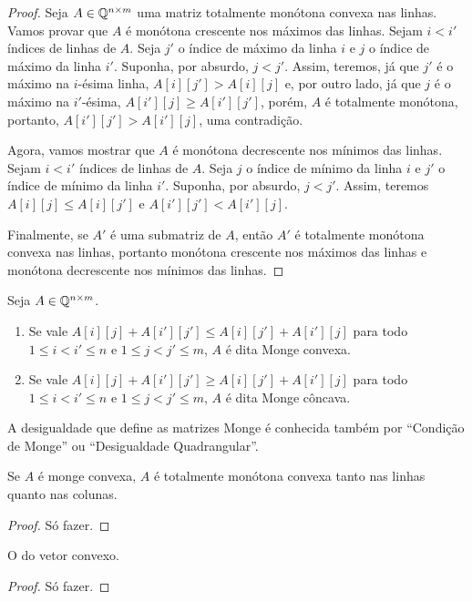 \begin{proof}
Seja $A \in \mathbb{Q}^{n \times m}$ uma matriz totalmente monótona convexa nas linhas. Vamos provar que $A$ é monótona crescente nos máximos das linhas. Sejam $i < i'$ índices de linhas de $A$. Seja $j'$ o índice de máximo da linha $i$ e $j$ o índice de máximo da linha $i'$. Suponha, por absurdo, $j < j'$. Assim, teremos, já que $j'$ é o máximo na $i$-ésima linha, $A[i][j'] > A[i][j]$ e, por outro lado, já que $j$ é o máximo na $i'$-ésima, $A[i'][j] \geq A[i'][j']$, porém, $A$ é totalmente monótona, portanto, $A[i'][j'] > A[i'][j]$, uma contradição.  

Agora, vamos mostrar que $A$ é monótona decrescente nos mínimos das linhas. Sejam $i < i'$ índices de linhas de $A$. Seja $j$ o índice de mínimo da linha $i$ e $j'$ o índice de mínimo da linha $i'$. Suponha, por absurdo, $j < j'$. Assim, teremos $A[i][j] \leq A[i][j']$ e $A[i'][j'] < A[i'][j]$.

Finalmente, se $A'$ é uma submatriz de $A$, então $A'$ é totalmente monótona convexa nas linhas, portanto monótona crescente nos máximos das linhas e monótona decrescente nos mínimos das linhas.
\end{proof}

\begin{defi} \label{defi:MatrizMonge}
Seja $A \in \mathbb{Q}^{n \times m}$.
    \begin{enumerate}
        \item Se vale $A[i][j] + A[i'][j'] \leq A[i][j'] + A[i'][j]$ para todo $1 \leq i < i' \leq n$ e $1 \leq j < j' \leq m$, $A$ é dita Monge convexa.
        \item Se vale $A[i][j] + A[i'][j'] \geq A[i][j'] + A[i'][j]$ para todo $1 \leq i < i' \leq n$ e $1 \leq j < j' \leq m$, $A$ é dita Monge côncava.
    \end{enumerate}
\end{defi}

A desigualdade que define as matrizes Monge é conhecida também por ``Condição de Monge'' ou ``Desigualdade Quadrangular''.

\begin{theo}
Se $A$ é monge convexa, $A$ é totalmente monótona convexa tanto nas linhas quanto nas colunas.
\end{theo}

\begin{proof}
Só fazer.
\end{proof}

\begin{theo}
O do vetor convexo.
\end{theo}

\begin{proof}
Só fazer.
\end{proof}


